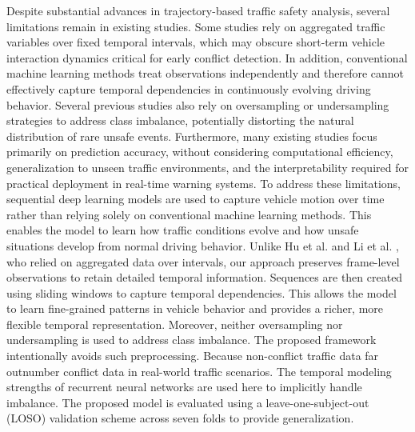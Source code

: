 \documentclass[12pt]{article}
\begin{document}
\begin{enumerate}
Despite substantial advances in trajectory-based traffic safety analysis, several limitations remain in existing studies. Some studies rely on aggregated traffic variables over fixed temporal intervals, which may obscure short-term vehicle interaction dynamics critical for early conflict detection. In addition, conventional machine learning methods treat observations independently and therefore cannot effectively capture temporal dependencies in continuously evolving driving behavior. Several previous studies also rely on oversampling or undersampling strategies to address class imbalance, potentially distorting the natural distribution of rare unsafe events. Furthermore, many existing studies focus primarily on prediction accuracy, without considering computational efficiency, generalization to unseen traffic environments, and the interpretability required for practical deployment in real-time warning systems.
To address these limitations, sequential deep learning models are used to capture vehicle motion over time rather than relying solely on conventional machine learning methods. This enables the model to learn how traffic conditions evolve and how unsafe situations develop from normal driving behavior. Unlike Hu et al. \cite{hu2022high} and Li et al. \cite{li2025real}, who relied on aggregated data over intervals, our approach preserves frame-level observations to retain detailed temporal information. Sequences are then created using sliding windows to capture temporal dependencies. This allows the model to learn fine-grained patterns in vehicle behavior and provides a richer, more flexible temporal representation. Moreover, neither oversampling nor undersampling is used to address class imbalance. The proposed framework intentionally avoids such preprocessing. Because non-conflict traffic data far outnumber conflict data in real-world traffic scenarios. The temporal modeling strengths of recurrent neural networks are used here to implicitly handle imbalance. The proposed model is evaluated using a leave-one-subject-out (LOSO) validation scheme across seven folds to provide generalization.


\end{enumerate}
\end{document}
